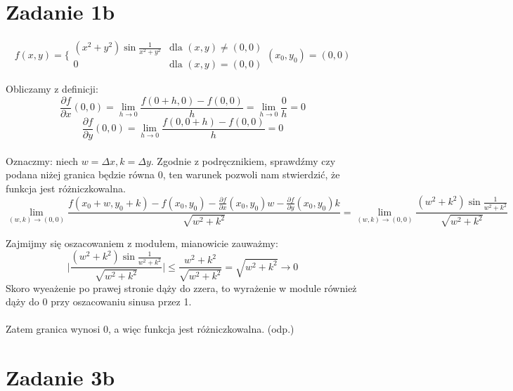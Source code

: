 \documentclass{article}
\begin{document}


\section*{Zadanie 1b}

$$f(x,y)=\bigg\{\begin{array}{rl}
(x^2+y^2) \sin{\frac{1}{x^2+y^2}} & \textrm{dla $(x,y) \neq (0,0)$} \\ 0 & \textrm{dla $(x,y) = (0,0)$} \end{array} (x_0,y_0) = (0,0) $$

Obliczamy z definicji:
$$\frac{\partial f}{\partial x} (0,0) = \lim_{h \to 0} \frac{f(0+h,0)-f(0,0)}{h} = \lim_{h \to 0} \frac{0}{h} = 0$$
$$\frac{\partial f}{\partial y} (0,0) = \lim_{h \to 0} \frac{f(0,0+h)-f(0,0)}{h} = 0$$ \\
Oznaczmy: niech $w = \Delta x, k = \Delta y$. Zgodnie z podręcznikiem, sprawdźmy czy podana niżej granica będzie równa 0, ten warunek pozwoli nam stwierdzić, że funkcja jest różniczkowalna.
$$\lim_{(w,k) \to (0,0)} \frac{f(x_0+w,y_0+k)-f(x_0,y_0) - \frac{\partial f}{\partial x}(x_0,y_0)w - \frac{\partial f}{\partial y} (x_0,y_0)k}{\sqrt{w^2 + k^2}} = \lim_{(w,k) \to (0,0)} \frac{(w^2+k^2) \sin{\frac{1}{w^2+k^2}}}{\sqrt{w^2+k^2}}$$

Zajmijmy się oszacowaniem z modułem, mianowicie zauważmy:
$$\Big| \frac{(w^2+k^2) \sin{\frac{1}{w^2+k^2}}}{\sqrt{w^2+k^2}}\Big| \leq \frac{w^2+k^2}{\sqrt{w^2+k^2}} = \sqrt{w^2+k^2} \to 0$$
Skoro wyeażenie po prawej stronie dąży do zzera, to wyrażenie w module również dąży do 0 przy oszacowaniu sinusa przez 1. \\ \\
Zatem granica wynosi 0, a więc funkcja jest różniczkowalna. (odp.)

\section*{Zadanie 3b}
\end{document}
